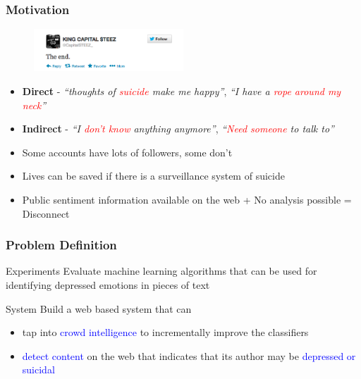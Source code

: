 \documentclass{beamer}
\begin{document}
    \begin{frame}
        \frametitle{Motivation}
        \begin{figure}
            \centering
            \includegraphics[width=0.5\textwidth]{figures/twitter_kcs.png}
        \end{figure}
        \begin{itemize}
            \item{\textbf{Direct} - \emph{``thoughts of \textcolor{red}{suicide} make me happy''}, \emph{``I have a \textcolor{red}{rope around my neck}''}}
            \item{\textbf{Indirect} - \emph{``I \textcolor{red}{don't know} anything anymore''}, \emph{``\textcolor{red}{Need someone} to talk to''}}
            \pause
            \item{Some accounts have lots of followers, some don't}
            \item{Lives can be saved if there is a surveillance system of suicide}
            \item{Public sentiment information available on the web + No analysis possible = Disconnect}
        \end{itemize}
    \end{frame}
    
    \begin{frame}
        \frametitle{Problem Definition}
        \begin{block}{Experiments}
            Evaluate machine learning algorithms that can be used for identifying depressed emotions in pieces of text
        \end{block}
        \begin{block}{System}
            Build a web based system that can
            \begin{itemize}
                \item{tap into \textcolor{blue}{crowd intelligence} to incrementally improve the classifiers}
                \item{\textcolor{blue}{detect content} on the web that indicates that its author may be \textcolor{blue}{depressed or suicidal}}
            \end{itemize}
        \end{block}
    \end{frame}
    
\end{document}
